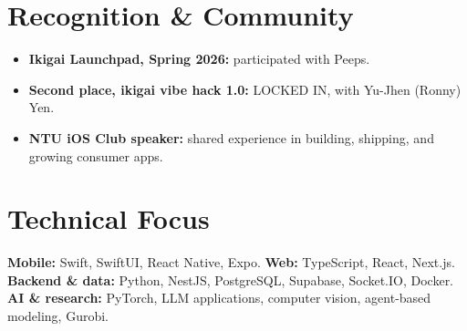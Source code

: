 \documentclass[10pt,a4paper]{article}
\begin{document}
\section{Recognition \& Community}
\begin{itemize}
\item \textbf{Ikigai Launchpad, Spring 2026:} participated with Peeps.
\item \textbf{Second place, ikigai vibe hack 1.0:} LOCKED IN, with Yu-Jhen (Ronny) Yen.
\item \textbf{NTU iOS Club speaker:} shared experience in building, shipping, and growing consumer apps.
\end{itemize}

\section{Technical Focus}
\textbf{Mobile:} Swift, SwiftUI, React Native, Expo.\quad
\textbf{Web:} TypeScript, React, Next.js.\\
\textbf{Backend \& data:} Python, NestJS, PostgreSQL, Supabase, Socket.IO, Docker.\\
\textbf{AI \& research:} PyTorch, LLM applications, computer vision, agent-based modeling, Gurobi.
\end{document}
